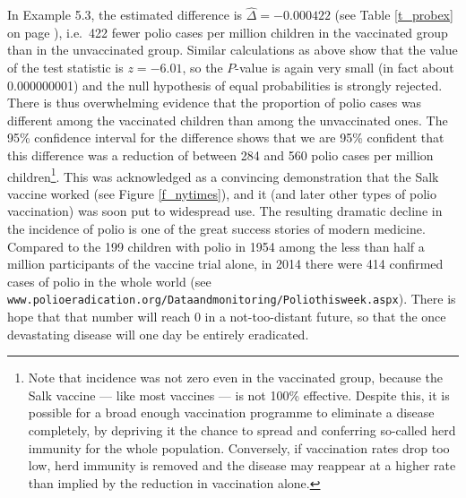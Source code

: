 In Example 5.3, the estimated difference
is $\hat{\Delta}=-0.000422$
(see Table
\ref{t_probex} on page \pageref{t_probex}),
i.e.\ 422 fewer
polio cases per million children in the vaccinated group
than in the unvaccinated group.
Similar calculations as above show that
the value of the test statistic is $z=-6.01$, so the
$P$-value is again very small (in fact about 0.000000001) and the null
hypothesis of equal probabilities is strongly rejected. There is thus
overwhelming evidence that the proportion of polio cases was different
among the vaccinated children than among the
unvaccinated ones.
The 95\% confidence interval for the difference
shows
that we are 95\% confident that this difference was a reduction of
between 284 and 560 polio cases per million children\footnote{Note that
incidence was not zero even in the vaccinated group, because the Salk
vaccine --- like most vaccines --- is not 100\% effective. Despite this,
it is possible for a broad enough vaccination programme to eliminate a
disease completely, by depriving it the chance to spread and
conferring so-called herd immunity for the whole
population. Conversely, if vaccination rates drop too low, herd immunity
is removed and the disease may reappear at a higher rate than implied by
the reduction in vaccination alone.}.
This was acknowledged as a convincing demonstration that the
Salk vaccine worked (see Figure \ref{f_nytimes}), and it (and later other types of polio vaccination)
was soon put to widespread use. The resulting dramatic decline in the
incidence of polio is one of the great success stories of modern
medicine. Compared to the 199 children with polio in 1954 among the less
than half a million participants of the vaccine trial alone, in 2014
there were 414 confirmed cases of polio in the whole world (see
\texttt{www.polioeradication.org/Dataandmonitoring/Poliothisweek.aspx}). There is hope that
that number will reach 0 in a not-too-distant future, so that the once
devastating disease will one day be entirely eradicated.

